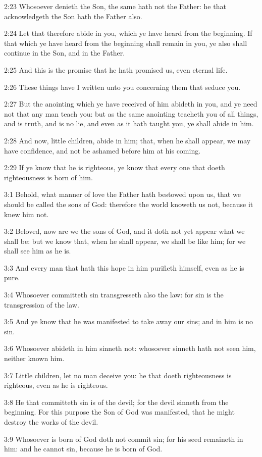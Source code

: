 2:23 Whosoever denieth the Son, the same hath not the Father: he that
acknowledgeth the Son hath the Father also.

2:24 Let that therefore abide in you, which ye have heard from the
beginning. If that which ye have heard from the beginning shall remain
in you, ye also shall continue in the Son, and in the Father.

2:25 And this is the promise that he hath promised us, even eternal
life.

2:26 These things have I written unto you concerning them that seduce
you.

2:27 But the anointing which ye have received of him abideth in you,
and ye need not that any man teach you: but as the same anointing
teacheth you of all things, and is truth, and is no lie, and even as
it hath taught you, ye shall abide in him.

2:28 And now, little children, abide in him; that, when he shall
appear, we may have confidence, and not be ashamed before him at his
coming.

2:29 If ye know that he is righteous, ye know that every one that
doeth righteousness is born of him.

3:1 Behold, what manner of love the Father hath bestowed upon us, that
we should be called the sons of God: therefore the world knoweth us
not, because it knew him not.

3:2 Beloved, now are we the sons of God, and it doth not yet appear
what we shall be: but we know that, when he shall appear, we shall be
like him; for we shall see him as he is.

3:3 And every man that hath this hope in him purifieth himself, even
as he is pure.

3:4 Whosoever committeth sin transgresseth also the law: for sin is
the transgression of the law.

3:5 And ye know that he was manifested to take away our sins; and in
him is no sin.

3:6 Whosoever abideth in him sinneth not: whosoever sinneth hath not
seen him, neither known him.

3:7 Little children, let no man deceive you: he that doeth
righteousness is righteous, even as he is righteous.

3:8 He that committeth sin is of the devil; for the devil sinneth from
the beginning. For this purpose the Son of God was manifested, that he
might destroy the works of the devil.

3:9 Whosoever is born of God doth not commit sin; for his seed
remaineth in him: and he cannot sin, because he is born of God.

